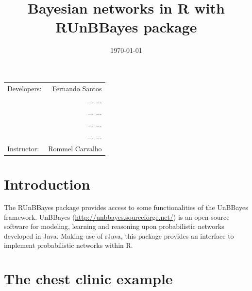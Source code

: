 \documentclass{article}
\title{Bayesian networks in R with RUnBBayes package} %
\date{\today} %
\begin{document}
\maketitle %

\begin{center}
\begin{tabular}{l r}
Developers: & Fernando Santos \\ %
& ... ... \\
& ... ... \\
& ... ... \\
& ... ... \\
Instructor: & Rommel Carvalho %
\end{tabular}
\end{center}



\section{Introduction}

The RUnBBayes package provides access to some functionalities of the UnBBayes framework. UnBBayes (\url {http://unbbayes.sourceforge.net/}) is an open source software for modeling, learning and reasoning upon probabilistic networks developed in Java. Making use of rJava, this package provides an interface to implement probabilistic networks within R.




\section{The chest clinic example}
\end{document}
